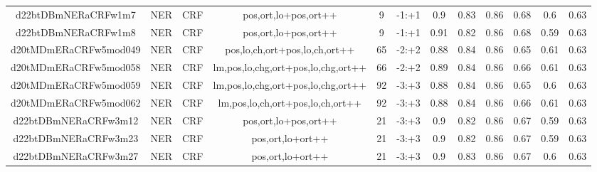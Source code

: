 \documentclass[a4paper]{article}
\begin{document}
\begin{landscape}
\begin{center}
\begin{tabular}{ |c|c|c|c|c|c|c|c|c|c|c|c|}
 	
 
 	
 		
 		\small{ d22btDBmNERaCRFw1m7 } & NER & CRF & pos,ort,lo+pos,ort++  &  9 &  -1:+1  &  0.9 & 0.83 & 0.86  &  0.68 & 0.6 & 0.63 \\
 		

 	
 
 	
 		
 		\small{ d22btDBmNERaCRFw1m8 } & NER & CRF & pos,ort,lo+pos,ort++  &  9 &  -1:+1  &  0.91 & 0.82 & 0.86  &  0.68 & 0.59 & 0.63 \\
 		

 	
 
 	
 		
 		\small{ d20tMDmERaCRFw5mod049 } & NER & CRF & pos,lo,ch,ort+pos,lo,ch,ort++  &  65 &  -2:+2  &  0.88 & 0.84 & 0.86  &  0.65 & 0.61 & 0.63 \\
 		

 	
 
 	
 		
 		\small{ d20tMDmERaCRFw5mod058 } & NER & CRF & lm,pos,lo,chg,ort+pos,lo,chg,ort++  &  66 &  -2:+2  &  0.89 & 0.84 & 0.86  &  0.66 & 0.61 & 0.63 \\
 		

 	
 
 	
 		
 		\small{ d20tMDmERaCRFw5mod059 } & NER & CRF & lm,pos,lo,chg,ort+pos,lo,chg,ort++  &  92 &  -3:+3  &  0.88 & 0.84 & 0.86  &  0.65 & 0.6 & 0.63 \\
 		

 	
 
 	
 		
 		\small{ d20tMDmERaCRFw5mod062 } & NER & CRF & lm,pos,lo,ch,ort+pos,lo,ch,ort++  &  92 &  -3:+3  &  0.88 & 0.84 & 0.86  &  0.66 & 0.61 & 0.63 \\
 		

 	
 
 	
 		
 		\small{ d22btDBmNERaCRFw3m12 } & NER & CRF & pos,ort,lo+pos,ort++  &  21 &  -3:+3  &  0.9 & 0.82 & 0.86  &  0.67 & 0.59 & 0.63 \\
 		

 	
 
 	
 		
 		\small{ d22btDBmNERaCRFw3m23 } & NER & CRF & pos,ort,lo+ort++  &  21 &  -3:+3  &  0.9 & 0.82 & 0.86  &  0.67 & 0.59 & 0.63 \\
 		

 	
 
 	
 		
 		\small{ d22btDBmNERaCRFw3m27 } & NER & CRF & pos,ort,lo+ort++  &  21 &  -3:+3  &  0.9 & 0.83 & 0.86  &  0.67 & 0.6 & 0.63 \\
 		


\end{tabular}
\end{center}
\end{landscape}
\end{document}
